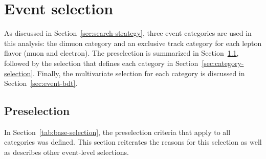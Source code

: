 \clearpage
\section{Event selection}
\label{sec:event-selection}

As discussed in Section~\ref{sec:search-strategy}, three event categories are used in this analysis: the dimuon category and an exclusive track category for each lepton flavor (muon and electron). The preselection is summarized in Section~\ref{sec:preselection}, followed by the selection that defines each category in Section~\ref{sec:category-selection}. Finally, the multivariate selection for each category is discussed in Section~\ref{sec:event-bdt}.

\subsection{Preselection}
\label{sec:preselection}

In Section~\ref{tab:base-selection}, the preselection criteria that apply to all categories was defined. This section reiterates the reasons for this selection as well as describes other event-level selections.

